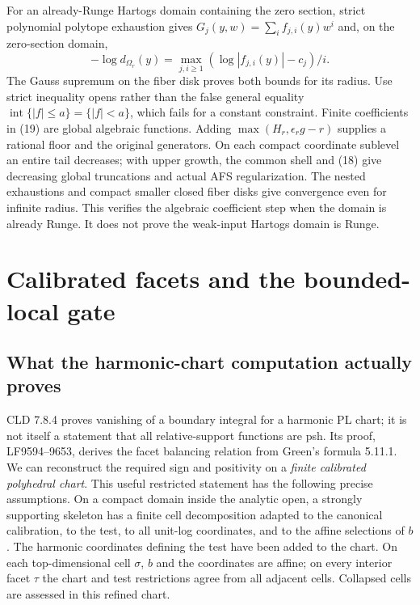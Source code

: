 \documentclass[
  11pt,
]{article}
\begin{document}
For an already-Runge Hartogs domain containing the zero section, strict
polynomial polytope exhaustion gives \(G_j(y,w)=\sum_i f_{j,i}(y)w^i\)
and, on the zero-section domain, \[-\log d_{\Omega_r}(y)=\max_{j,i\ge1}
                         (\log|f_{j,i}(y)|-c_j)/i.                    \tag{19}\]
The Gauss supremum on the fiber disk proves both bounds for its radius.
Use strict inequality opens rather than the false general equality
\(\operatorname{int}\{|f|\le a\}=\{|f|<a\}\), which fails for a constant
constraint. Finite coefficients in (19) are global algebraic functions.
Adding \(\max(H_r,\epsilon_rg-r)\) supplies a rational floor and the
original generators. On each compact coordinate sublevel an entire tail
decreases; with upper growth, the common shell and (18) give decreasing
global truncations and actual AFS regularization. The nested exhaustions
and compact smaller closed fiber disks give convergence even for
infinite radius. This verifies the algebraic coefficient step when the
domain is already Runge. It does not prove the weak-input Hartogs domain
is Runge.

\section{Calibrated facets and the bounded-local
gate}\label{calibrated-facets-and-the-bounded-local-gate}

\subsection{What the harmonic-chart computation actually
proves}\label{what-the-harmonic-chart-computation-actually-proves}

CLD 7.8.4 proves vanishing of a boundary integral for a harmonic PL
chart; it is not itself a statement that all relative-support functions
are psh. Its proof, LF9594--9653, derives the facet balancing relation
from Green's formula 5.11.1. We can reconstruct the required sign and
positivity on a \emph{finite calibrated polyhedral chart}. This useful
restricted statement has the following precise assumptions. On a compact
domain inside the analytic open, a strongly supporting skeleton has a
finite cell decomposition adapted to the canonical calibration, to the
test, to all unit-log coordinates, and to the affine selections of
\(b\). The harmonic coordinates defining the test have been added to the
chart. On each top-dimensional cell \(\sigma\), \(b\) and the
coordinates are affine; on every interior facet \(\tau\) the chart and
test restrictions agree from all adjacent cells. Collapsed cells are
assessed in this refined chart.
\end{document}
